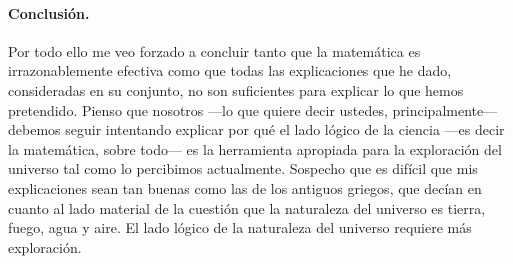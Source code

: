 \documentclass[a4paper, 12pt]{article}
\begin{document}
\paragraph*{Conclusión.} Por todo ello me veo forzado a concluir tanto que la matemática es irrazonablemente efectiva como que todas las explicaciones que he dado, consideradas en su conjunto, no son suficientes para explicar lo que hemos pretendido. Pienso que nosotros ---lo que quiere decir ustedes, principalmente--- debemos seguir intentando explicar por qué el lado lógico de la ciencia ---es decir la matemática, sobre todo--- es la herramienta apropiada para la exploración del universo tal como lo percibimos actualmente. Sospecho que es difícil que mis explicaciones sean tan buenas como las de los antiguos griegos, que decían en cuanto al lado material de la cuestión que la naturaleza del universo es tierra, fuego, agua y aire. El lado lógico de la naturaleza del universo requiere más exploración.
\end{document}
